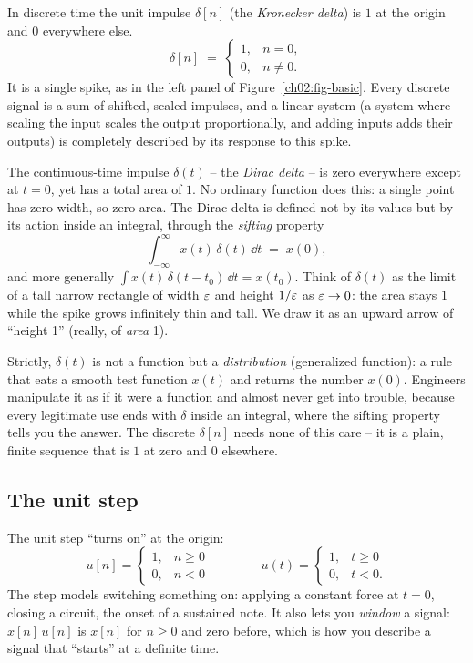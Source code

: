 In discrete time the unit impulse $\delta[n]$ (the \emph{Kronecker delta}) is $1$ at the
origin and $0$ everywhere else.
\[
  \delta[n] \;=\;
  \begin{cases}
    1, & n = 0,\\
    0, & n \neq 0.
  \end{cases}
\]
It is a single spike, as in the left panel of Figure~\ref{ch02:fig-basic}.
Every discrete signal is a sum of shifted,
scaled impulses, and a linear system (a system where scaling the input scales the output proportionally, and adding inputs adds their outputs) is completely described by its response
to this spike.

The continuous-time impulse $\delta(t)$ -- the \emph{Dirac delta} -- is zero everywhere except at $t=0$, yet has a total area of $1$. No ordinary function does this: a single point has zero width, so
zero area. The Dirac delta is defined not by its values but by its action inside
an integral, through the \emph{sifting} property
\[
  \int_{-\infty}^{\infty} x(t)\,\delta(t)\,\dd t \;=\; x(0),
\]
and more generally $\int x(t)\,\delta(t - t_0)\,\dd t = x(t_0)$. Think of
$\delta(t)$ as the limit of a tall narrow rectangle of width $\varepsilon$ and height
$1/\varepsilon$ as $\varepsilon \to 0$: the area stays $1$ while the spike grows infinitely thin
and tall. We draw it as an upward arrow of ``height 1'' (really, of \emph{area} 1).

\begin{formalbox}
Strictly, $\delta(t)$ is not a function but a \emph{distribution} (generalized
function): a rule that eats a smooth test function $x(t)$ and returns the number
$x(0)$. Engineers manipulate it as if it were a function and almost never get into
trouble, because every legitimate use ends with $\delta$ inside an integral, where
the sifting property tells you the answer. The discrete $\delta[n]$ needs none of
this care -- it is a plain, finite sequence that is $1$ at zero and $0$ elsewhere.
\end{formalbox}

\subsection{The unit step}
\label{ch02:step}

The unit step ``turns on'' at the origin:
\[
  u[n] =
  \begin{cases} 1, & n \ge 0 \\ 0, & n < 0 \end{cases}
  \qquad\qquad
  u(t) =
  \begin{cases} 1, & t \ge 0 \\ 0, & t < 0. \end{cases}
\]
The step models switching something on: applying a constant force at $t=0$, closing
a circuit, the onset of a sustained note. It also lets you \emph{window} a signal:
$x[n]\,u[n]$ is $x[n]$ for $n \ge 0$ and zero before, which is how you describe a
signal that ``starts'' at a definite time.

